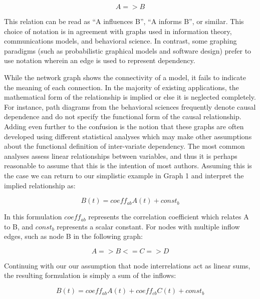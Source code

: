 \documentclass[runningheads,a4paper]{llncs}
\begin{document}
\begin{equation}
  A => B
  \label{eq:simplest-sample}
\end{equation}

This relation can be read as ``A influences B'', ``A informs B'', or similar.  
This choice of notation is in agreement with graphs used in information theory, communications models, and behavioral science.
In contrast, some graphing paradigms (such as probabilistic graphical models and software design) prefer to use notation wherein an edge is used to represent dependency.

While the network graph shows the connectivity of a model, it fails to indicate the meaning of each connection.
In the majority of existing applications, the mathematical form of the relationship is implied or else it is neglected completely.
For instance, path diagrams from the behavioral sciences frequently denote causal dependence and do not specify the functional form of the causal relationship.
Adding even further to the confusion is the notion that these graphs are often developed using different statistical analyses which may make other assumptions about the functional definition of inter-variate dependency.
The most common analyses assess linear relationships between variables, and thus it is perhaps reasonable to assume that this is the intention of most authors.
Assuming this is the case we can return to our simplistic example in Graph 1 and interpret the implied relationship as:

\begin{equation}
    B(t) = coeff_{ab}A(t) + const_b
    \label{eq:linear-formula}
\end{equation}

In this formulation $coeff_{ab}$ represents the correlation coefficient which relates A to B, and $const_b$ represents a scalar constant.
For nodes with multiple inflow edges, such as node B in the following graph:

\begin{equation}
    A => B <= C => D
    \label{eq:less-simple-graph}
\end{equation}

Continuing with our our assumption that node interrelations act as linear sums, the resulting formulation is simply a sum of the inflows:

\begin{equation}
    B(t) = coeff_{ab}A(t) + coeff_{cb}C(t) + const_b
    \label{linear-formulation}
\end{equation}
\end{document}
